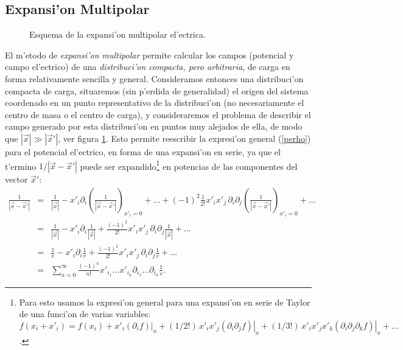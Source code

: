 \subsection{Expansi'on Multipolar}
\begin{figure}[!h]
\centerline{ }
\caption{Esquema de la expansi'on multipolar el'ectrica.}
\label{fig:emc}
\end{figure}
El m'etodo de {\em expansi'on multipolar} permite calcular los campos (potencial y campo el'ectrico) de una
\textit{distribuci'on compacta, pero arbitraria}, de carga en forma relativamente sencilla y general. Consideramos entonces una distribuci'on compacta de carga, situaremos (sin p'erdida de generalidad) el origen del sistema coordenado en un punto representativo de la distribuci'on (no necesariamente el centro de masa o el centro de carga), y consideraremos el problema de describir el
campo generado por esta distribuci'on en puntos muy alejados de ella, de modo
que $|\vec{x}|\gg|\vec{x}'|$, ver figura \ref{fig:emc}. Esto permite
reescribir la expresi'on general (\ref{perho}) para el potencial
el'ectrico, en forma de una expansi'on en serie, ya
que el t'ermino $1/\left|\vec{x}-\vec{x}'\right|$ puede ser expandido\footnote{Para esto usamos la expresi'on general para una expansi'on en serie de Taylor de una funci'on de varias variables: $f(x_i+x'_i)=f(x_i)+x'_i\left.(\partial_if)\right|_x+(1/2!)\,x'_ix'_j\left.(\partial_i\partial_jf)\right|_x +(1/3!)\,x'_ix'_jx'_k\left.(\partial_i\partial_j\partial_kf)\right|_x+\dots$.}
en potencias de las componentes del vector $\vec{x}'$:
\begin{eqnarray}
\frac{1}{\left|\vec{x}-\vec{x}'\right|}
&=&\frac{1}{\left|\vec{x}\right|}
-x'_i\partial_i\left(\frac{1}{\left|\vec{x}-\vec{x}'\right|} \right)
_{x'_i=0}+\dots+(-1)^2\frac{1}{2!}x'_ix'_j\,
\partial_i\partial_j\left(\frac{1} { \left|\vec{x}-\vec{x}
'\right|} \right) _{x'_i=0}+\dots \\
&=&\frac{1}{\left|\vec{x}\right|}-x'_i\partial_i\frac{1}{\left|\vec{x}\right|}
 +\frac{(-1)^2}{2!}x'_ix'_j\,\partial_i\partial_j\frac{1}{\left|\vec{x}\right|}
+\dots \\
&=&\frac{1}{r}-x'_i\partial_i\frac{1}{r}+\frac{(-1)^2}{2!}x'_ix'_j\,
\partial_i\partial_j\frac{1}{r} +\dots \\
&=&\sum_{n=0}^\infty\frac{(-1)^n}{n!}x'_{i_1}\dots x'_{i_n}\partial_{i_1}\dots
\partial_{i_n}\frac{1}{r} .\label{exp1or}
\end{eqnarray}
